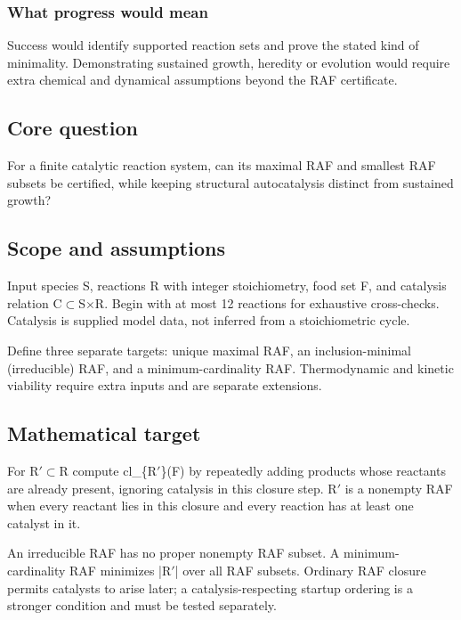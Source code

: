 \documentclass[
  11pt,
]{article}
\newcounter{none} %
\begin{document}
\subsubsection{What progress would mean}

Success would identify supported reaction sets and prove the stated kind
of minimality. Demonstrating sustained growth, heredity or evolution
would require extra chemical and dynamical assumptions beyond the RAF
certificate.

\subsection{Core question}

For a finite catalytic reaction system, can its maximal RAF and smallest
RAF subsets be certified, while keeping structural autocatalysis
distinct from sustained growth?

\subsection{Scope and assumptions}

Input species S, reactions R with integer stoichiometry, food set F, and
catalysis relation C\ensuremath{\subset}S\ensuremath{\times}R. Begin
with at most 12 reactions for exhaustive cross-checks. Catalysis is
supplied model data, not inferred from a stoichiometric cycle.

Define three separate targets: unique maximal RAF, an inclusion-minimal
(irreducible) RAF, and a minimum-cardinality RAF. Thermodynamic and
kinetic viability require extra inputs and are separate extensions.

\subsection{Mathematical target}

For R\ensuremath{\prime}\ensuremath{\subset}R compute
cl\_\{R\ensuremath{\prime}\}(F) by repeatedly adding products whose
reactants are already present, ignoring catalysis in this closure step.
R\ensuremath{\prime} is a nonempty RAF when every reactant lies in this
closure and every reaction has at least one catalyst in it.

An irreducible RAF has no proper nonempty RAF subset. A
minimum-cardinality RAF minimizes |R\ensuremath{\prime}| over all RAF
subsets. Ordinary RAF closure permits catalysts to arise later; a
catalysis-respecting startup ordering is a stronger condition and must
be tested separately.
\end{document}
